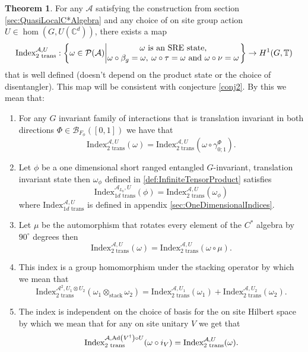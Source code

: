 \documentclass[12pt,a4paper,twoside]{article}
\let\originalleft\left
\let\originalright\right
\renewcommand{\left}{\mathopen{}\mathclose\bgroup\originalleft}
\renewcommand{\right}{\aftergroup\egroup\originalright}
\newcommand{\BB}{\mathcal B}
\newcommand{\PP}{\mathcal P}
\newcommand{\CC}{\mathbb C}
\newcommand{\TT}{\mathbb T}
\renewcommand{\AA}{\mathcal A}
\newcommand{\Ad}[1]{\textrm{Ad}\left(#1\right)}
\theoremstyle{definition}
\newtheorem{theorem}{Theorem}[section]
\numberwithin{equation}{section}
\begin{document}
\begin{theorem}\label{thrm:MainResult2}
	For any $\AA$ satisfying the construction from section \ref{sec:QuasiLocalC*Algebra} and any choice of on site group action $U\in\hom(G,U(\CC^d))$, there exists a map
	\begin{equation}
		\textrm{Index}_{2\text{ trans}}^{\AA,U}:\left\{\omega\in\PP(\AA)\left| \begin{matrix}\omega\text{ is an SRE state,}\\\omega\circ\beta_g=\omega,\:\omega\circ\tau=\omega\text{ and }\omega\circ\nu=\omega\end{matrix} \right.\right\}\rightarrow H^1(G,\TT)
	\end{equation}
	that is well defined (doesn't depend on the product state or the choice of disentangler). This map will be consistent with conjecture \ref{conj2}. By this we mean that:
	\begin{enumerate}
		\item For any $G$ invariant family of interactions that is translation invariant in both directions $\Phi\in\BB_{F_\phi}([0,1])$ we have that
		\begin{equation}
			\textrm{Index}_{2\text{ trans}}^{\AA,U}(\omega)=\textrm{Index}_{2\text{ trans}}^{\AA,U}(\omega\circ\gamma^\Phi_{0;1}).
		\end{equation}
		\item Let $\phi$ be a one dimensional short ranged entangled $G$-invariant, translation invariant state then $\omega_\phi$ defined in \ref{def:InfiniteTensorProduct} satisfies
		\begin{equation}
			\textrm{Index}_{1d\text{ trans}}^{\AA_{L_0},U}(\phi)=\text{Index}_{2\text{ trans}}^{\AA,U}(\omega_\phi)
		\end{equation}
		where $\textrm{Index}_{1d\text{ trans}}^{\AA,U}$ is defined in appendix \ref{sec:OneDimensionalIndices}.
		\item Let $\mu$ be the automorphism that rotates every element of the $C^*$ algebra by $90^\circ$ degrees then
		\begin{equation}
			\textrm{Index}_{\text{2 trans}}^{\AA,U}(\omega)=\textrm{Index}_{\text{2 trans}}^{\AA,U}(\omega\circ\mu).
		\end{equation}
		\item This index is a group homomorphism under the stacking operator by which we mean that
		\begin{equation}
			\textrm{Index}_{\text{2 trans}}^{\AA^2,U_1\otimes U_2}(\omega_1\otimes_{\text{stack}}\omega_2)=\textrm{Index}_{\text{2 trans}}^{\AA,U_1}(\omega_1)+\textrm{Index}_{\text{2 trans}}^{\AA,U_2}(\omega_2).
		\end{equation}
		\item The index is independent on the choice of basis for the on site Hilbert space by which we mean that for any on site unitary $V$ we get that
		\begin{equation}
			\textrm{Index}^{\AA,\Ad{V^\dagger}\circ U}_{\text{2 trans}}(\omega\circ i_V)=\textrm{Index}^{\AA,U}_{\text{2 trans}}(\omega).
		\end{equation}
	\end{enumerate}
\end{theorem}
\end{document}
